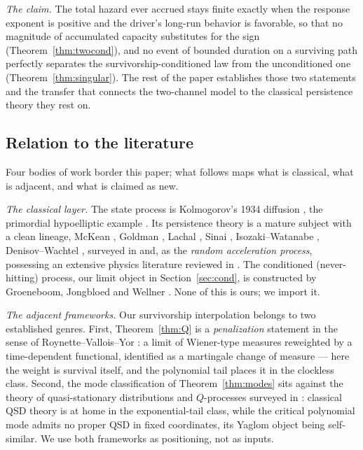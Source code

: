 \documentclass[11pt]{article}
\theoremstyle{definition}
\theoremstyle{remark}
\begin{document}
\emph{The claim.} The total hazard ever accrued stays finite exactly when
the response exponent is positive and the driver's long-run behavior is
favorable, so that no magnitude of accumulated capacity substitutes for
the sign (Theorem~\ref{thm:twocond}), and no event of bounded duration on a
surviving path perfectly separates the survivorship-conditioned law
from the unconditioned one (Theorem~\ref{thm:singular}). The rest of the
paper establishes those two statements and the transfer that connects
the two-channel model to the classical persistence theory they rest
on.

\subsection{Relation to the literature}
Four bodies of work border this paper; what follows maps what is
classical, what is adjacent, and what is claimed as new.

\emph{The classical layer.} The state process is Kolmogorov's 1934
diffusion \cite{Kol34}, the primordial hypoelliptic example
\cite{Hor67}. Its persistence theory is a mature subject with a clean
lineage, McKean \cite{McK63}, Goldman \cite{Gol71}, Lachal
\cite{Lac91}, Sinai \cite{Sin92}, Isozaki--Watanabe \cite{IW94},
Denisov--Wachtel \cite{DW15}, surveyed in \cite{AS15} and, as the
\emph{random acceleration process}, possessing an extensive physics
literature reviewed in \cite{BMS13}. The conditioned (never-hitting)
process, our limit object in Section~\ref{sec:cond}, is constructed by
Groeneboom, Jongbloed and Wellner \cite{GJW99}. None of this is ours;
we import it.

\emph{The adjacent frameworks.} Our survivorship interpolation belongs
to two established genres. First, Theorem~\ref{thm:Q} is a
\emph{penalization} statement in the sense of Roynette--Vallois--Yor
\cite{RVY06}: a limit of Wiener-type measures reweighted by a
time-dependent functional, identified as a martingale change of
measure --- here the weight is survival itself, and the polynomial
tail places it in the clockless class. Second, the mode classification
of Theorem~\ref{thm:modes} sits against the theory of quasi-stationary
distributions and $Q$-processes surveyed in \cite{MV12}: classical QSD
theory is at home in the exponential-tail class, while the critical
polynomial mode admits no proper QSD in fixed coordinates, its Yaglom
object being self-similar. We use both frameworks as positioning, not
as inputs.
\end{document}
